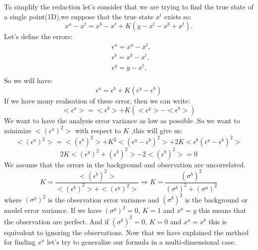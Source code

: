 \noindent To simplify the redaction let's consider that we are trying to find the true state of a single point(1D),we suppose that the true state $x^t$ exists so:
$$x^a-x^t=x^b-x^t+K(y-x^t-x^b+x^t).$$
Let's define the errors:
$$\begin{aligned}
&\epsilon^a=x^a-x^t, \\
&\epsilon^b=x^b-x^t, \\
&\epsilon^y=y-x^t, \\
\end{aligned}$$
So we will have:
$$\epsilon^a=\epsilon^b+K(\epsilon^y-\epsilon^b)$$
If we have many realisation of these error, then we can write:
$$<\epsilon^a>=<\epsilon^b>+K(<\epsilon^y>-<\epsilon^b>)$$
We want to have the analysis error variance as low as possible .So we want to minimize $<(\epsilon^a)^2>$ with respect to $K$ ,this will give us:
$$<(\epsilon^a)^2>=<(\epsilon^b)^2>+K^2<(\epsilon^y-\epsilon^b)^2>+2K<\epsilon^b(\epsilon^y-\epsilon^b)^2>$$
$$2K<(\epsilon^y)^2+(\epsilon^b)^2>-2<(\epsilon^b)^2>=0$$
\noindent We assume that the errors in the background and observation are uncorrelated.
$$K=\frac{<(\epsilon^b)^2>}{<(\epsilon^b)^2>+<(\epsilon^y)^2>} \Rightarrow K=\frac{(\sigma^b)^2}{(\sigma^b)^2+(\sigma^y)^2} $$
where $(\sigma^y)^2$ is the observation error variance and $(\sigma^b)^2$ is the background or model error variance.
\newline\noindent If we have $(\sigma^y)^2=0$, $K=1$ and $x^a=y$  this means that the observation are perfect.
\newline\noindent And if $(\sigma^b)^2=0$, $K=0$ and $x^a=x^b$ this is equivalent to ignoring the observations.
\vspace*{5mm}
\newline Now that we have explained the method for finding $x^a$ let's try to generalize our formula in a multi-dimensional case.

